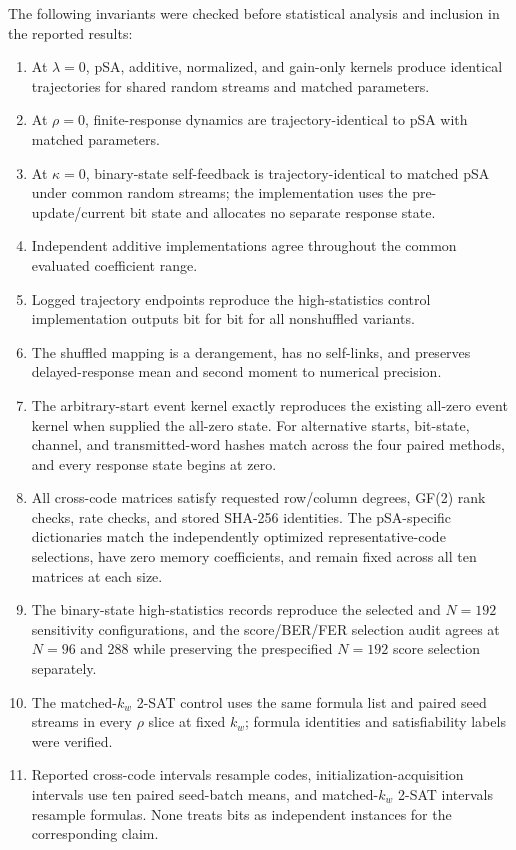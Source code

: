 \documentclass[aps,prapplied,preprint,superscriptaddress,longbibliography,floatfix]{revtex4-2}
\newcommand{\psa}{pSA}
\begin{document}
The following invariants were checked before statistical analysis and inclusion in the reported results:
\begin{enumerate}
\item At $\lambda=0$, \psa{}, additive, normalized, and gain-only kernels produce identical trajectories for shared random streams and matched parameters.
\item At $\rho=0$, finite-response dynamics are trajectory-identical to \psa{} with matched parameters.
\item At $\kappa=0$, binary-state self-feedback is trajectory-identical to matched \psa{} under common random streams; the implementation uses the pre-update/current bit state and allocates no separate response state.
\item Independent additive implementations agree throughout the common evaluated coefficient range.
\item Logged trajectory endpoints reproduce the high-statistics control implementation outputs bit for bit for all nonshuffled variants.
\item The shuffled mapping is a derangement, has no self-links, and preserves delayed-response mean and second moment to numerical precision.
\item The arbitrary-start event kernel exactly reproduces the existing all-zero event kernel when supplied the all-zero state.  For alternative starts, bit-state, channel, and transmitted-word hashes match across the four paired methods, and every response state begins at zero.
\item All cross-code matrices satisfy requested row/column degrees, GF(2) rank checks, rate checks, and stored SHA-256 identities.  The pSA-specific dictionaries match the independently optimized representative-code selections, have zero memory coefficients, and remain fixed across all ten matrices at each size.
\item The binary-state high-statistics records reproduce the selected and $N=192$ sensitivity configurations, and the score/BER/FER selection audit agrees at $N=96$ and 288 while preserving the prespecified $N=192$ score selection separately.
\item The matched-$k_w$ 2-SAT control uses the same formula list and paired seed streams in every $\rho$ slice at fixed $k_w$; formula identities and satisfiability labels were verified.
\item Reported cross-code intervals resample codes, initialization-acquisition intervals use ten paired seed-batch means, and matched-$k_w$ 2-SAT intervals resample formulas.  None treats bits as independent instances for the corresponding claim.
\end{enumerate}
\end{document}
